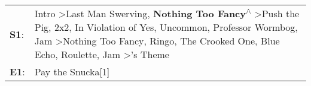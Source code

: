 \begin{supertabular}{p{0.03\textwidth}p{0.92\textwidth}}
 \textbf{S1}:  &  Intro\textsuperscript{} \textgreater \enspace Last Man Swerving\textsuperscript{}, \enspace \textbf{Nothing Too Fancy\textsuperscript{$\wedge$}} \textgreater \enspace Push the Pig\textsuperscript{}, \enspace 2x2\textsuperscript{}, \enspace In Violation of Yes\textsuperscript{}, \enspace Uncommon\textsuperscript{}, \enspace Professor Wormbog\textsuperscript{}, \enspace Jam\textsuperscript{} \textgreater \enspace Nothing Too Fancy\textsuperscript{}, \enspace Ringo\textsuperscript{}, \enspace The Crooked One\textsuperscript{}, \enspace Blue Echo\textsuperscript{}, \enspace Roulette\textsuperscript{}, \enspace Jam\textsuperscript{} \textgreater {}'s Theme\textsuperscript{}  \enspace  \\
 \textbf{E1}:  &                                                                                                                                                                                                                                                                                                                                                                                                                                                                                                                                                                                                                                                                             Pay the Snucka[1]\textsuperscript{}  \enspace  \\
\end{supertabular}
